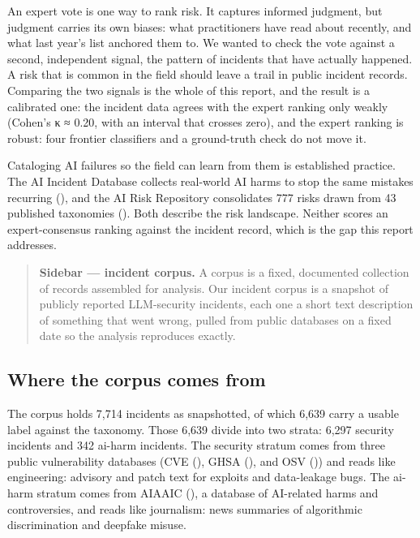 \documentclass[11pt]{article}
\begin{document}
An expert vote is one way to rank risk. It captures informed judgment,
but judgment carries its own biases: what practitioners have read about
recently, and what last year's list anchored them to. We wanted to check
the vote against a second, independent signal, the pattern of incidents
that have actually happened. A risk that is common in the field should
leave a trail in public incident records. Comparing the two signals is
the whole of this report, and the result is a calibrated one: the
incident data agrees with the expert ranking only weakly (Cohen's κ ≈
0.20, with an interval that crosses zero), and the expert ranking is
robust: four frontier classifiers and a ground-truth check do not move
it.

Cataloging AI failures so the field can learn from them is established
practice. The AI Incident Database collects real-world AI harms to stop
the same mistakes recurring (), and the AI Risk Repository consolidates 777 risks drawn from 43
published taxonomies (). Both describe the risk landscape. Neither scores an
expert-consensus ranking against the incident record, which is the gap
this report addresses.

\begin{quote}
\textbf{Sidebar --- incident corpus.} A corpus is a fixed, documented
collection of records assembled for analysis. Our incident corpus is a
snapshot of publicly reported LLM-security incidents, each one a short
text description of something that went wrong, pulled from public
databases on a fixed date so the analysis reproduces exactly.
\end{quote}

\subsection{Where the corpus comes
from}\label{where-the-corpus-comes-from}

The corpus holds 7,714 incidents as snapshotted, of which 6,639 carry a
usable label against the taxonomy. Those 6,639 divide into two strata:
6,297 security incidents and 342 ai-harm incidents. The security stratum
comes from three public vulnerability databases (CVE
(), GHSA
(), and OSV ()) and reads like engineering: advisory
and patch text for exploits and data-leakage bugs. The ai-harm stratum
comes from AIAAIC (), a database of
AI-related harms and controversies, and reads like journalism: news
summaries of algorithmic discrimination and deepfake misuse.
\end{document}
